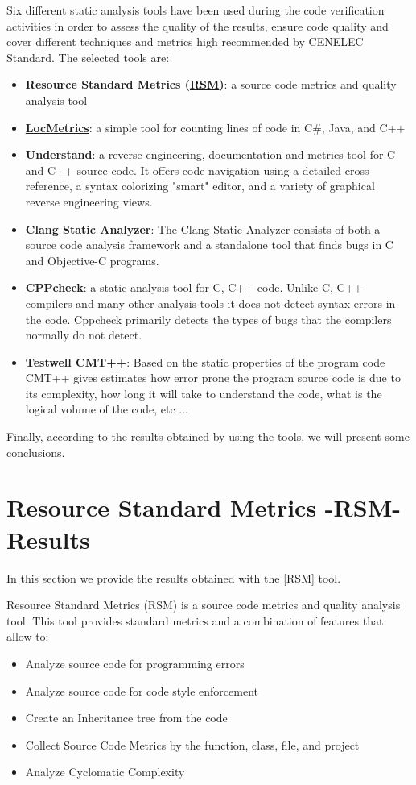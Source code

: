 Six different static analysis tools have been used during the code verification activities in order to assess the quality of the results, ensure code quality and cover different techniques and metrics high recommended by CENELEC Standard. The selected tools are:
\begin{itemize}
\item \textbf{Resource Standard Metrics (\href{http://msquaredtechnologies.com/m2rsm/}{RSM})}: a source code metrics and quality analysis tool
\item \textbf{\href{http://www.locmetrics.com/}{LocMetrics}}: a simple tool for counting lines of code in C\#, Java, and C++
\item \textbf{\href{http://www.scitools.com/}{Understand}}: a reverse engineering, documentation and metrics tool for C and C++ source code. It offers code navigation using a detailed cross reference, a syntax colorizing "smart" editor, and a variety of graphical reverse engineering views.                          
\item \textbf{\href{http://clang-analyzer.llvm.org/}{Clang Static Analyzer}}: The Clang Static Analyzer consists of both a source code analysis framework and a standalone tool that finds bugs in C and Objective-C programs.
\item \textbf{\href{http://cppcheck.sourceforge.net/}{CPPcheck}}: a static analysis tool for C, C++ code. Unlike C, C++ compilers and many other analysis tools it does not detect syntax errors in the code. Cppcheck primarily detects the types of bugs that the compilers normally do not detect. 
\item \textbf{\href{http://www.verifysoft.com/en_cmtx.html}{Testwell CMT++}}: Based on the static properties of the program code CMT++ gives estimates how error prone the program source code is due to its complexity, how long it will take to understand the code, what is the logical volume of the code, etc ...
\end{itemize}


Finally, according to the results obtained by using the tools, we will present some conclusions.

\section{Resource Standard Metrics -RSM- Results}
In this section we provide the results obtained with the \href{http://msquaredtechnologies.com/m2rsm/}{[RSM]} tool.

Resource Standard Metrics (RSM) is a source code metrics and quality analysis tool. This tool provides standard metrics and a combination of features that allow to:
\begin{itemize}
\item Analyze source code for programming errors
\item Analyze source code for code style enforcement
\item Create an Inheritance tree from the code
\item Collect Source Code Metrics by the function, class, file, and project
\item Analyze Cyclomatic Complexity
\end{itemize}

